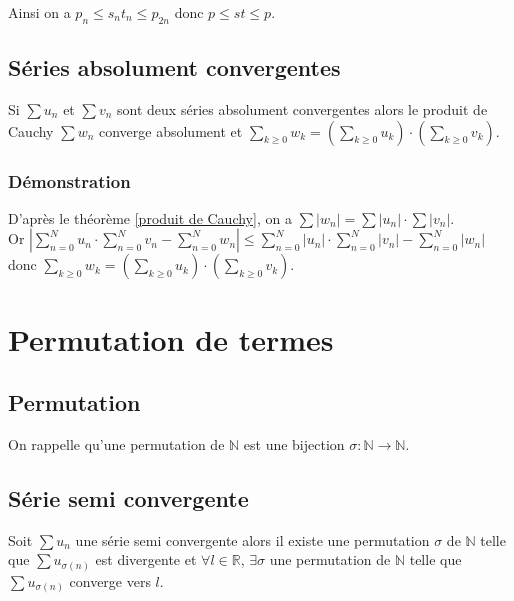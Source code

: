 \documentclass[a4paper,10pt]{book} %
\newcommand{\R}{\mathbb{R}}
\newcommand{\N}{\mathbb{N}}
\newcommand{\abs}[1]{\left|#1\right|}
\newcommand{\displayAmath}{\displaystyle}
\begin{document}
Ainsi on a $p_n\leq s_nt_n\leq p_{2n}$ donc $p\leq st\leq p$.

\subsection{Séries absolument convergentes}
Si $\sum u_n$ et $\sum v_n$ sont deux séries absolument convergentes alors le produit de Cauchy $\sum w_n$ converge absolument et $\displayAmath \sum_{k\geq 0} w_k=(\sum_{k\geq 0} u_k)\cdot (\sum_{k\geq 0} v_k)$.

\subsubsection{Démonstration}
D'après le théorème \ref{produit de Cauchy}, on a $\displayAmath\sum\abs{w_n}=\sum \abs{u_n}\cdot \sum\abs{v_n}$.\\
Or $\displayAmath\abs{\sum_{n=0}^N u_n\cdot\sum_{n=0}^N v_n-\sum_{n=0}^N w_n}\leq \sum_{n=0}^N \abs{u_n}\cdot\sum_{n=0}^N \abs{v_n}-\sum_{n=0}^N \abs{w_n}$ donc $\displayAmath\sum_{k\geq 0} w_k=(\sum_{k\geq 0} u_k)\cdot (\sum_{k\geq 0} v_k)$.


\section{Permutation de termes}
\subsection{Permutation}
On rappelle qu'une permutation de $\N$ est une bijection $\sigma : \N\rightarrow\N$.

\subsection{Série semi convergente}
Soit $\sum u_n$ une série semi convergente alors il existe une permutation $\sigma$ de $\N$ telle que $\sum u_{\sigma(n)}$ est divergente et $\forall l\in \R$, $\exists \sigma$ une permutation de $\N$ telle que $\sum u_{\sigma(n)}$ converge vers $l$.
\end{document}
